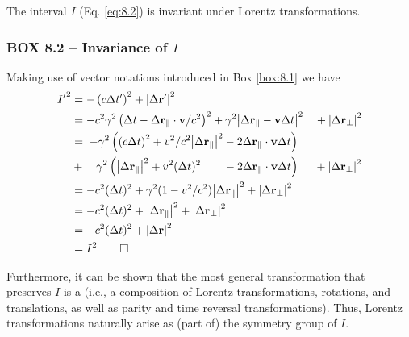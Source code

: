 The interval $I$ (Eq. \ref{eq:8.2}) is invariant under Lorentz transformations. 

\subsubsection*{BOX 8.2 -- Invariance of $I$}\label{box:8.2}
\parindent=0pt  %
\parbox{\textwidth}{\begin{mdframed}[style=MyFrame] %
Making use of vector notations introduced in Box \ref{box:8.1} we have 
\begin{align*}
{I'}^2 &=  - \left(c \Delta t'\right)^2 + \abs{\Delta \vb{r}'}^2\\
       &= -c^2 \gamma^2 \left(\Delta t - \Delta \vb{r}_\parallel \cdot \vb{v} /c^2 \right)^2
          +    \gamma^2 \abs{\Delta \vb{r}_\parallel - \vb{v} \Delta t}^2 \quad + \abs{\Delta \vb{r}_\perp}^2\\
       &=\;    -\gamma^2 \left( {(c \Delta t)}^2 + v^2/c^2 \abs{\Delta \vb{r}_\parallel}^2      -2 \Delta \vb{r}_\parallel \cdot \vb{v} \Delta t \right)\\
       &+ \quad \gamma^2 \left( \abs{\Delta \vb{r}_\parallel}^2 + v^2 (\Delta t)^2 \quad\quad   -2 \Delta \vb{r}_\parallel \cdot \vb{v} \Delta t \right)\quad\:\: + \abs{\Delta \vb{r}_\perp}^2\\
       &= - c^2 (\Delta t)^2  + \gamma^2 (1 - v^2/c^2) \abs{\Delta \vb{r}_\parallel}^2 + \abs{\Delta \vb{r}_\perp}^2\\
       &= - c^2 (\Delta t)^2  + \abs{\Delta \vb{r}_\parallel}^2 + \abs{\Delta \vb{r}_\perp}^2\\
       &= - c^2 (\Delta t)^2  + \abs{\Delta \vb{r}}^2\\ 
       &= I^2\qed
\end{align*}

\end{mdframed}} %
\parindent=10pt %

\newpage
Furthermore, it can be shown that the most general transformation that preserves $I$ is a  (i.e., a composition of Lorentz transformations, rotations, and translations, as well as parity and time reversal transformations). Thus, Lorentz transformations naturally arise as (part of) the symmetry group of $I$.


